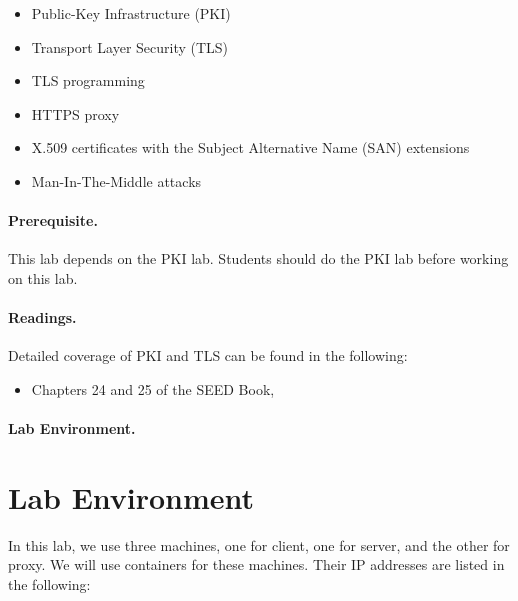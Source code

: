 \begin{itemize}[noitemsep]
\item Public-Key Infrastructure (PKI)
\item Transport Layer Security (TLS)
\item TLS programming
\item HTTPS proxy 
\item X.509 certificates with the Subject Alternative Name (SAN) extensions
\item Man-In-The-Middle attacks
\end{itemize}


\paragraph{Prerequisite.} This lab depends on the PKI lab. Students should 
do the PKI lab before working on this lab. 

\paragraph{Readings.}
Detailed coverage of PKI and TLS can be found in the following:

\begin{itemize}
\item Chapters 24 and 25 of the SEED Book, \seedbook
\end{itemize}


\paragraph{Lab Environment.} \seedenvironmentC




\newpage

\section{Lab Environment}

In this lab, we use three machines, one for client, one for server,
and the other for proxy. We will use containers for these machines.  
Their IP addresses are listed in the following:



